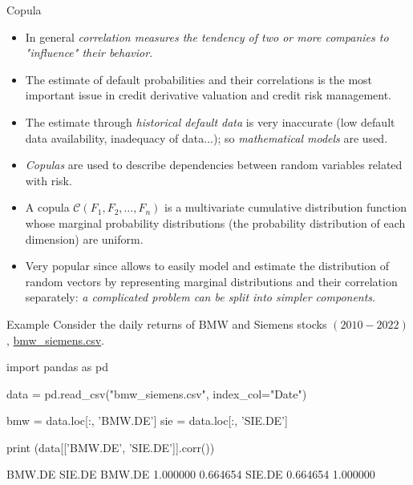 \documentclass{beamer}
\begin{document}
\begin{frame}{Copula}
  \begin{itemize}
  \item In general \emph{correlation measures the tendency of two or more companies to "influence" their behavior}. 
  \item The estimate of default probabilities and their correlations is the most important issue in credit derivative valuation and credit risk management. 
  \item The estimate through \emph{historical default data} is very inaccurate (low default data availability, inadequacy of data...); so \emph{mathematical models} are used.
  \item \emph{Copulas} are used to describe dependencies between random variables related with risk. 
  \item A copula $\mathcal{C}(F_1, F_2, \ldots, F_n)$ is a multivariate cumulative distribution function whose marginal probability distributions (the probability distribution of each dimension) are uniform. 
  \item Very popular since allows to easily model and estimate the distribution of random vectors by representing marginal distributions and their correlation separately: \emph{a complicated problem can be split into simpler components}.
  \end{itemize}
\end{frame}

\begin{frame}[fragile]{Example}
  Consider the daily returns of BMW and Siemens stocks $(2010-2022)$, \href{https:\/\/github.com\/matteosan1\/finance\_course\/raw\/develop\/input\_files\/bmw\_siemens.csv}{bmw\_siemens.csv}.
  \begin{ipython}
import pandas as pd

data = pd.read_csv("bmw_siemens.csv", index_col="Date")

bmw = data.loc[:, 'BMW.DE']
sie = data.loc[:, 'SIE.DE']

print (data[['BMW.DE', 'SIE.DE']].corr())
\end{ipython}
  \begin{ioutput}
          BMW.DE    SIE.DE
BMW.DE  1.000000  0.664654
SIE.DE  0.664654  1.000000    
\end{ioutput}
\end{frame}
\end{document}
